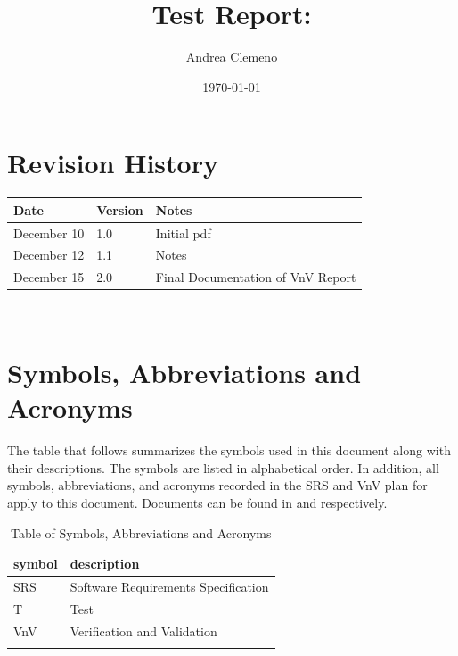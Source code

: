 \documentclass[12pt, titlepage]{article}
\begin{document}
\title{Test Report: \progname{}} 
\author{Andrea Clemeno}
\date{\today}
	
\maketitle


\section{Revision History}

\begin{tabularx}{\textwidth}{p{3cm}p{2cm}X}
\toprule {\bf Date} & {\bf Version} & {\bf Notes}\\
\midrule
December 10 & 1.0 & Initial pdf\\
December 12 & 1.1 & Notes\\
December 15 & 2.0 & Final Documentation of VnV Report\\

\bottomrule
\end{tabularx}

~\newpage

\section{Symbols, Abbreviations and Acronyms}

The table that follows summarizes the symbols used in this document along with
their descriptions. The symbols are listed in alphabetical order. In addition, 
all symbols, abbreviations, and acronyms recorded in the SRS and VnV plan for 
\progname{} 
apply to this document. Documents can be found in \citet{SRS} and 
\citet{DiagnoseVNVplan} respectively.


\begin{table}[h!]
\renewcommand{\arraystretch}{1.2}
\noindent \begin{longtable*}{l p{8cm}} \toprule
\textbf{symbol} & \textbf{description}\\
\midrule 
SRS & Software Requirements Specification
\\
T & Test 
\\
VnV & Verification and Validation 
\\
&\\
\bottomrule

\end{longtable*}
\caption{Table of Symbols, Abbreviations and Acronyms}
\end{table}
\end{document}
